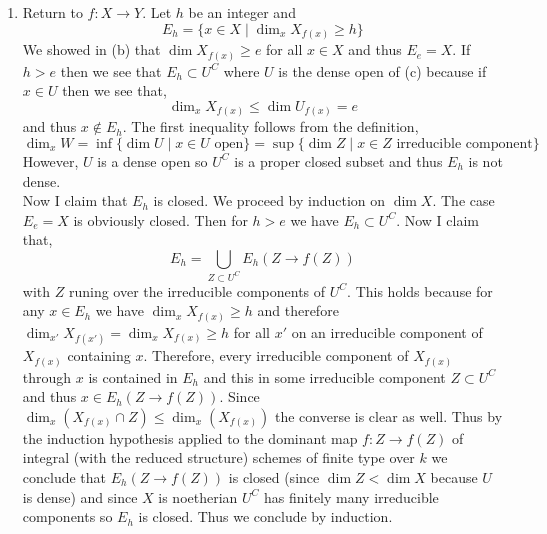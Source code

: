 \documentclass[12pt]{article}
\begin{document}
\begin{enumerate}
\item Return to $f : X \to Y$. Let $h$ be an integer and
\[ E_h = \{ x \in X \mid \dim_x{X_{f(x)}} \ge h \} \] 
We showed in (b) that $\dim{X_{f(x)}} \ge e$ for all $x \in X$ and thus $E_e = X$. If $h > e$ then we see that $E_h \subset U^C$ where $U$ is the dense open of (c) because if $x \in U$ then we see that,
\[ \dim_x{X_{f(x)}} \le \dim{U_{f(x)}} = e \]
and thus $x \notin E_h$. The first inequality follows from the definition,
\[ \dim_x{W} = \inf \{ \dim{U} \mid x \in U \text{ open} \} = \sup \{ \dim{Z} \mid x \in Z \text{ irreducible component} \} \]
However, $U$ is a dense open so $U^C$ is a proper closed subset and thus $E_h$ is not dense.
\bigskip\\
Now I claim that $E_h$ is closed. We proceed by induction on $\dim{X}$. The case $E_e = X$ is obviously closed. Then for $h > e$ we have $E_h \subset U^C$. Now I claim that,
\[ E_h = \bigcup_{Z \subset U^C} E_h(Z \to f(Z)) \]
with $Z$ runing over the irreducible components of $U^C$. This holds because for any $x \in E_h$ we have $\dim_x{X_{f(x)}} \ge h$ and therefore $\dim_{x'}{X_{f(x')}} = \dim_x{X_{f(x)}} \ge h$ for all $x'$ on an irreducible component of $X_{f(x)}$ containing $x$. Therefore, every irreducible component of $X_{f(x)}$ through $x$ is contained in $E_h$ and this in some irreducible component $Z \subset U^C$ and thus $x \in E_h(Z \to f(Z))$. Since $\dim_x{(X_{f(x)} \cap Z)} \le \dim_x{(X_{f(x)})}$ the converse is clear as well. Thus by the induction hypothesis applied to the dominant map $f : Z \to f(Z)$ of integral (with the reduced structure) schemes of finite type over $k$ we conclude that $E_h(Z \to f(Z))$ is closed (since $\dim{Z} < \dim{X}$ because $U$ is dense) and since $X$ is noetherian $U^C$ has finitely many irreducible components so $E_h$ is closed. Thus we conclude by induction.


\end{enumerate}
\end{document}
